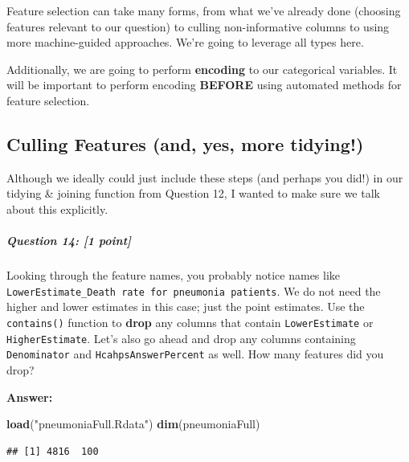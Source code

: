 \documentclass[
]{article}
\newenvironment{Shaded}{\begin{snugshade}}{\end{snugshade}}
\newcommand{\FunctionTok}[1]{\textcolor[rgb]{0.13,0.29,0.53}{\textbf{#1}}}
\newcommand{\NormalTok}[1]{#1}
\newcommand{\StringTok}[1]{\textcolor[rgb]{0.31,0.60,0.02}{#1}}
\begin{document}
Feature selection can take many forms, from what we've already done
(choosing features relevant to our question) to culling non-informative
columns to using more machine-guided approaches. We're going to leverage
all types here.

Additionally, we are going to perform \textbf{encoding} to our
categorical variables. It will be important to perform encoding
\textbf{BEFORE} using automated methods for feature selection.

\subsection{Culling Features (and, yes, more
tidying!)}\label{culling-features-and-yes-more-tidying}

Although we ideally could just include these steps (and perhaps you
did!) in our tidying \& joining function from Question 12, I wanted to
make sure we talk about this explicitly.

\subparagraph{\texorpdfstring{\textbf{Question 14}: {[}1
point{]}}{Question 14: {[}1 point{]}}}\label{question-14-1-point}

Looking through the feature names, you probably notice names like
\texttt{LowerEstimate\_Death\ rate\ for\ pneumonia\ patients}. We do not
need the higher and lower estimates in this case; just the point
estimates. Use the \texttt{contains()} function to \textbf{drop} any
columns that contain \texttt{LowerEstimate} or \texttt{HigherEstimate}.
Let's also go ahead and drop any columns containing \texttt{Denominator}
and \texttt{HcahpsAnswerPercent} as well. How many features did you
drop?

\textbf{Answer:}

\begin{Shaded}
\begin{Highlighting}[]
\FunctionTok{load}\NormalTok{(}\StringTok{"pneumoniaFull.Rdata"}\NormalTok{)}
\FunctionTok{dim}\NormalTok{(pneumoniaFull)}
\end{Highlighting}
\end{Shaded}

\begin{verbatim}
## [1] 4816  100
\end{verbatim}
\end{document}
